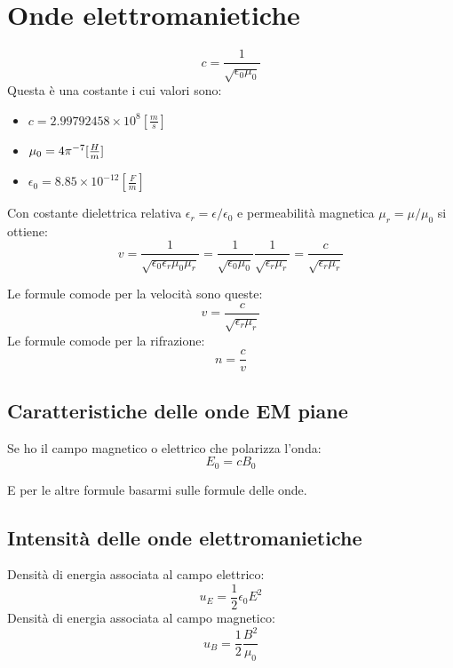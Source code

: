 \section{Onde elettromanietiche}
\begin{equation}
    c = \frac{1}{\sqrt{\epsilon_0\mu_0}}
\end{equation}
Questa è una costante i cui valori sono:
\begin{itemize}
    \item $c = 2.99792458\times 10^8 [\frac{m}{s}]$
    \item $\mu_0 = 4\pi \time 10^{-7} [\frac{H}{m}]$
    \item $\epsilon_0 = 8.85 \times 10^{-12} [\frac{F}{m}]$
\end{itemize}

Con costante dielettrica relativa $\epsilon_r = \epsilon/\epsilon_0$
e permeabilità magnetica $\mu_r = \mu/\mu_0$ si ottiene:
\begin{equation}
    v = \frac{1}{\sqrt{\epsilon_0\epsilon_r\mu_0\mu_r}} = 
    \frac{1}{\sqrt{\epsilon_0\mu_0}}\frac{1}{\sqrt{\epsilon_r\mu_r}} = 
    \frac{c}{\sqrt{\epsilon_r\mu_r}}
\end{equation}

Le formule comode per la velocità sono queste:
\begin{equation}
    v = \frac{c}{\sqrt{\epsilon_r\mu_r}}
\end{equation}
Le formule comode per la rifrazione:
\begin{equation}
    n = \frac{c}{v}
\end{equation}

\subsection{Caratteristiche delle onde EM piane}

Se ho il campo magnetico o elettrico che polarizza l'onda:
\begin{equation}
    E_0 = cB_0
\end{equation}

E per le altre formule basarmi sulle formule delle onde.

\subsection{Intensità delle onde elettromanietiche}

Densità di energia associata al campo elettrico:
\begin{equation}
    u_E = \frac{1}{2}\epsilon_0E^2
\end{equation}
Densità di energia associata al campo magnetico:
\begin{equation}
    u_B = \frac{1}{2}\frac{B^2}{\mu_0}
\end{equation}


